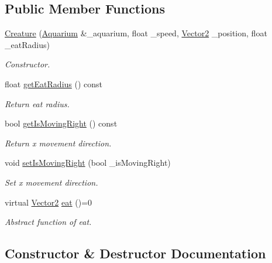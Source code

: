 \subsection*{Public Member Functions}
\begin{DoxyCompactItemize}
\item 
\mbox{\hyperlink{class_creature_ab12ad708dcef6c9cd0509f6769a6329a}{Creature}} (\mbox{\hyperlink{class_aquarium}{Aquarium}} \&\+\_\+aquarium, float \+\_\+speed, \mbox{\hyperlink{struct_vector2}{Vector2}} \+\_\+position, float \+\_\+eat\+Radius)
\begin{DoxyCompactList}\small\item\em Constructor. \end{DoxyCompactList}\item 
float \mbox{\hyperlink{class_creature_a24e52cedddd872269f83671c9a6f6925}{get\+Eat\+Radius}} () const
\begin{DoxyCompactList}\small\item\em Return eat radius. \end{DoxyCompactList}\item 
bool \mbox{\hyperlink{class_creature_a63abd829cfac5d57425452b39f2a21b7}{get\+Is\+Moving\+Right}} () const
\begin{DoxyCompactList}\small\item\em Return x movement direction. \end{DoxyCompactList}\item 
void \mbox{\hyperlink{class_creature_a7b222797d42b668ebf2a02eef51feaf8}{set\+Is\+Moving\+Right}} (bool \+\_\+is\+Moving\+Right)
\begin{DoxyCompactList}\small\item\em Set x movement direction. \end{DoxyCompactList}\item 
virtual \mbox{\hyperlink{struct_vector2}{Vector2}} \mbox{\hyperlink{class_creature_a0d531a4c04c1021833ddb0e48864dbf4}{eat}} ()=0
\begin{DoxyCompactList}\small\item\em Abstract function of eat. \end{DoxyCompactList}\end{DoxyCompactItemize}


\subsection{Constructor \& Destructor Documentation}
\mbox{\label{class_creature_ab12ad708dcef6c9cd0509f6769a6329a}} 
